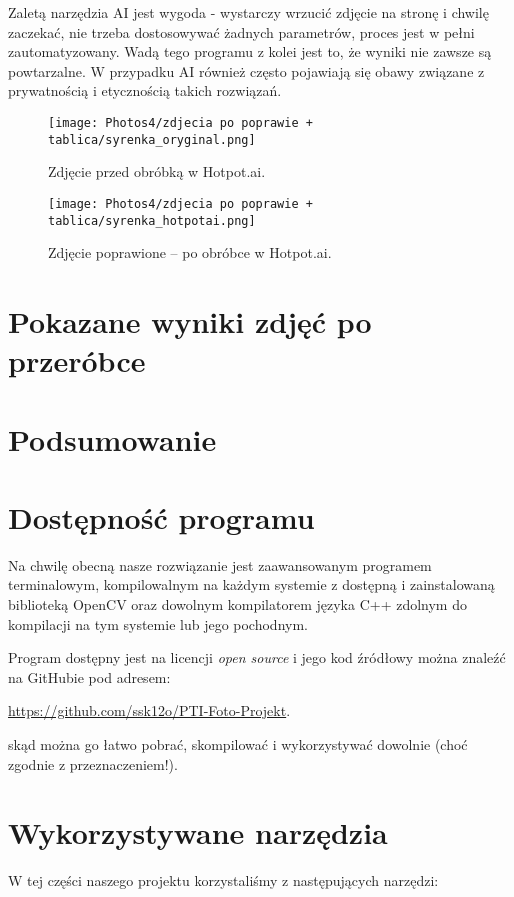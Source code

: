 \documentclass[]{mwart}
\begin{document}
Zaletą narzędzia AI jest wygoda - wystarczy wrzucić zdjęcie na stronę i chwilę zaczekać, nie trzeba dostosowywać żadnych parametrów, proces jest w pełni zautomatyzowany. Wadą tego programu z kolei jest to, że wyniki nie zawsze są powtarzalne. W przypadku AI również często pojawiają się obawy związane z prywatnością i etycznością takich rozwiązań.

\begin{figure}[H]
    \centering
    \texttt{[image: Photos4/zdjecia po poprawie + tablica/syrenka\_oryginal.png]}
    \caption{Zdjęcie przed obróbką w Hotpot.ai.}
\end{figure}
\begin{figure}[H]
    \centering
    \texttt{[image: Photos4/zdjecia po poprawie + tablica/syrenka\_hotpotai.png]}
    \caption{Zdjęcie poprawione -- po obróbce w Hotpot.ai.}
\end{figure}

\newpage
\section{Pokazane wyniki zdjęć po przeróbce}

\section{Podsumowanie}








\newpage
\section{Dostępność programu}
Na chwilę obecną nasze rozwiązanie jest zaawansowanym programem terminalowym,
kompilowalnym na każdym systemie z dostępną i zainstalowaną biblioteką OpenCV oraz
dowolnym kompilatorem języka C++ zdolnym do kompilacji na tym systemie lub jego pochodnym.

Program dostępny jest na licencji \textit{open source} i jego kod źródłowy można znaleźć na GitHubie
pod adresem:
\begin{center}
    \url{https://github.com/ssk12o/PTI-Foto-Projekt}.
\end{center}
skąd można go łatwo pobrać, skompilować i wykorzystywać dowolnie (choć zgodnie z przeznaczeniem!).




\section{Wykorzystywane narzędzia}
W tej części naszego projektu korzystaliśmy z następujących narzędzi:
\end{document}
